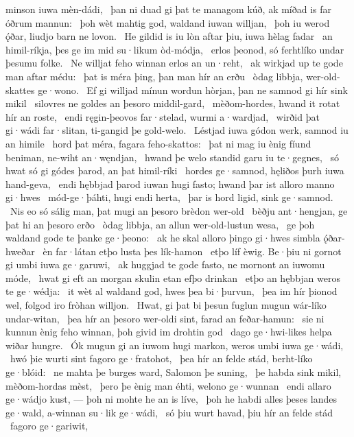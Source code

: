 minson iuwa mèn-dádi, \hld\ þan ni duad gi þat te managom kúð,
ak míðad is far óðrum mannun: \hld\ þoh wèt mahtig god,
waldand iuwan willjan, \hld\ þoh iu werod ǫ́ðar,
liudjo barn ne lovon. \hld\ He gildid is iu lòn aftar þiu,
iuwa hèlag fadar \hld\ an himil-ríkja,
þes ge im mid su·likum òd-módja, \hld\ erlos þeonod,
só ferhtlíko undar þesumu folke. \hld\ Ne willjat feho winnan
erlos an un·reht, \hld\ ak wirkjad up te gode
man aftar médu: \hld\ þat is méra þing,
þan man hír an erðu \hld\ òdag libbja,
wer-old-skattes ge·wono. \hld\ Ef gi willjad mínun wordun hòrjan,
þan ne samnod gi hír sink mikil \hld\ silovres ne goldes
an þesoro middil-gard, \hld\ mèðom-hordes,
hwand it rotat hír an roste, \hld\ endi ręgin-þeovos far·stelad,
wurmi a·wardjad, \hld\ wirðid þat gi·wádi far·slitan,
ti-gangid þe gold-welo. \hld\ Léstjad iuwa gódon werk,
samnod iu an himile \hld\ hord þat méra,
fagara feho-skattos: \hld\ þat ni mag iu ènig fíund beniman,
ne-wiht an·węndjan, \hld\ hwand þe welo standid
garu iu te·gegnes, \hld\ só hwat só gi gódes þarod,
an þat himil-ríki \hld\ hordes ge·samnod,
hęliðos þurh iuwa hand-geva, \hld\ endi hębbjad þarod iuwan hugi fasto;
hwand þar ist alloro manno gi·hwes \hld\ mód-ge·þáhti,
hugi endi herta, \hld\ þar is hord ligid,
sink ge·samnod. \hld\ Nis eo só sálig man,
þat mugi an þesoro brèdon wer-old \hld\ bèðju ant·hengjan,
ge þat hi an þesoro erðo \hld\ òdag libbja,
an allun wer-old-lustun wesa, \hld\ ge þoh waldand gode
te þanke ge·þeono: \hld\ ak he skal alloro þingo gi·hwes
simbla ǫ́ðar-hweðar \hld\ èn far·látan
etþo lusta þes lík-hamon \hld\ etþo líf èwig.
Be·þiu ni gornot gi umbi iuwa ge·garuwi, \hld\ ak huggjad te gode fasto,
ne mornont an iuwomu móde, \hld\ hwat gi eft an morgan skulin
etan efþo drinkan \hld\ etþo an hębbjan
weros te ge·wédja: \hld\ it wèt al waldand god,
hwes þea bi·þurvun, \hld\ þea im hír þionod wel,
folgod iro fròhan willjon. \hld\ Hwat, gi þat bi þesun fuglun mugun
wár-líko undar-witan, \hld\ þea hír an þesoro wer-oldi sint,
farad an feðar-hamun: \hld\ sie ni kunnun ènig feho winnan,
þoh givid im drohtin god \hld\ dago ge·hwi-likes
helpa wiðar hungre. \hld\ Ók mugun gi an iuwom hugi markon,
weros umbi iuwa ge·wádi, \hld\ hwó þie wurti sint
fagoro ge·fratohot, \hld\ þea hír an felde stád,
berht-líko ge·blóid: \hld\ ne mahta þe burges ward,
Salomon þe suning, \hld\ þe habda sink mikil,
mèðom-hordas mèst, \hld\ þero þe ènig man éhti,
welono ge·wunnan \hld\ endi allaro ge·wádjo kust, —
þoh ni mohte he an is líve, \hld\ þoh he habdi alles þeses landes ge·wald,
a-winnan su·lik ge·wádi, \hld\ só þiu wurt havad,
þiu hír an felde stád \hld\ fagoro ge·gariwit,
